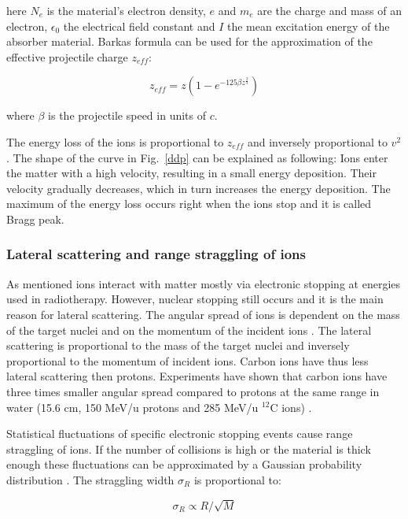 here $N_{e}$ is the material's electron density, $e$ and $m_{e}$ are the charge and mass 
of an electron, $\epsilon_{0}$ the electrical field constant and $I$ the mean excitation energy of the absorber material. 
Barkas formula \cite{Barkas1963} can be used for the approximation of the effective projectile charge $z_{eff}$: 

\begin{equation}
 z_{eff} = z \left( 1 - e^{-125 \beta z^{\frac{2}{3}}} \right)
\end{equation}

where $\beta$ is the projectile speed in units of $c$.

The energy loss of the ions is proportional to $z_{eff}$ and inversely proportional to $v^2$. The shape of the curve in Fig.~\ref{ddp} can be explained as following: Ions enter the matter with a high velocity, resulting in a small energy deposition. Their velocity gradually decreases, which in turn increases the energy deposition. The maximum of the energy loss occurs right when the ions stop and it is called Bragg peak.

\subsubsection{Lateral scattering and range straggling of ions}
\label{scat}
As mentioned ions interact with matter mostly via electronic stopping at energies used in radiotherapy. However, nuclear stopping still occurs and it is the main reason for lateral scattering.
The angular spread of ions is dependent on the mass of the target nuclei and on the momentum of the incident ions \cite{Moliere1948}. The lateral scattering is proportional to the mass of the target nuclei and inversely proportional
to the momentum of incident ions. Carbon ions have thus less lateral scattering then protons. Experiments have shown that carbon ions have three times smaller angular spread compared to protons at the same range in water 
(15.6 cm, 150 MeV/u protons and 285 MeV/u $^{12}$C ions) \cite{Schardt2010}.

Statistical fluctuations of specific electronic stopping events cause range straggling of ions. If the number of collisions is high or the material is thick enough these fluctuations can be approximated by
a Gaussian probability distribution \cite{Bohr1940, Ahlen1980}. The straggling width $\sigma_R$ is proportional to:

\begin{equation}
 \sigma_R \propto R/\sqrt{M}
\end{equation}

